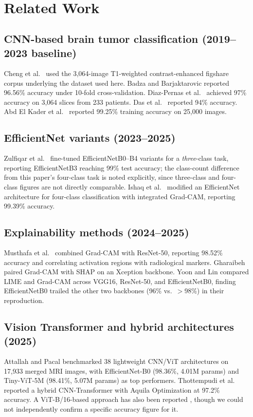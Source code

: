 \documentclass[journal]{IEEEtran}
\begin{document}
\section{Related Work}

\subsection{CNN-based brain tumor classification (2019--2023 baseline)}
Cheng et al.\ \cite{ref5} used the 3,064-image T1-weighted contrast-enhanced figshare corpus underlying the dataset used here. Badza and Barjaktarovic \cite{ref6} reported 96.56\% accuracy under 10-fold cross-validation. Diaz-Pernas et al.\ \cite{ref7} achieved 97\% accuracy on 3,064 slices from 233 patients. Das et al.\ \cite{ref8} reported 94\% accuracy. Abd El Kader et al.\ \cite{ref9} reported 99.25\% training accuracy on 25,000 images.

\subsection{EfficientNet variants (2023--2025)}
Zulfiqar et al.\ \cite{ref10} fine-tuned EfficientNetB0--B4 variants for a \emph{three}-class task, reporting EfficientNetB3 reaching 99\% test accuracy; the class-count difference from this paper's four-class task is noted explicitly, since three-class and four-class figures are not directly comparable. Ishaq et al.\ \cite{ref11} modified an EfficientNet architecture for four-class classification with integrated Grad-CAM, reporting 99.39\% accuracy.

\subsection{Explainability methods (2024--2025)}
Musthafa et al.\ \cite{ref12} combined Grad-CAM with ResNet-50, reporting 98.52\% accuracy and correlating activation regions with radiological markers. Gharaibeh \cite{ref13} paired Grad-CAM with SHAP on an Xception backbone. Yoon and Lin \cite{ref14} compared LIME and Grad-CAM across VGG16, ResNet-50, and EfficientNetB0, finding EfficientNetB0 trailed the other two backbones (96\% vs.\ $>$98\%) in their reproduction.

\subsection{Vision Transformer and hybrid architectures (2025)}
Attallah and Pacal \cite{ref15} benchmarked 38 lightweight CNN/ViT architectures on 17,933 merged MRI images, with EfficientNet-B0 (98.36\%, 4.01M params) and Tiny-ViT-5M (98.41\%, 5.07M params) as top performers. Thottempudi et al.\ \cite{ref16} reported a hybrid CNN-Transformer with Aquila Optimization at 97.2\% accuracy. A ViT-B/16-based approach has also been reported \cite{ref17}, though we could not independently confirm a specific accuracy figure for it.
\end{document}
